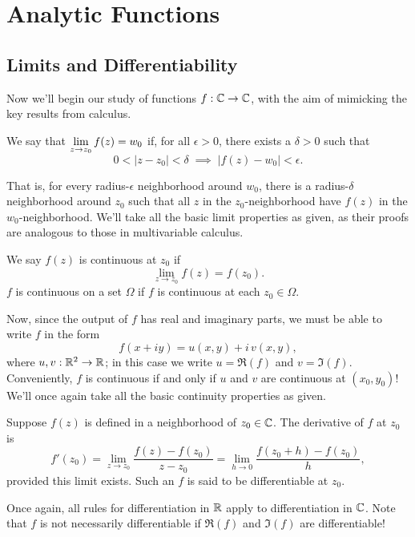 \documentclass[../m136main.tex]{subfiles}
\begin{document}
\chapter{Analytic Functions}
\section{Limits and Differentiability}
Now we'll begin our study of functions $f : \mathbb{C} \to \mathbb{C}$, with the aim of mimicking the key results from calculus.

\begin{definition}[Limit]
    We say that $\displaystyle \lim_{z \to z_0} f(z) = w_0$ if, for all $\epsilon > 0$, there exists a $\delta > 0$ such that \vspace{-6pt}
    \[ 0 < |z - z_0| < \delta \;\implies\; |f(z) - w_0| < \epsilon. \]
\end{definition}

That is, for every radius-$\epsilon$ neighborhood around $w_0$, there is a radius-$\delta$ neighborhood around $z_0$ such that all $z$ in the $z_0$-neighborhood have $f(z)$ in the $w_0$-neighborhood.
We'll take all the basic limit properties as given, as their proofs are analogous to those in multivariable calculus.

\begin{definition}[Continuity]
    We say $f(z)$ is continuous at $z_0$ if
    \[ \lim_{z \to z_0} f(z) = f(z_0). \]
    $f$ is continuous on a set $\Omega$ if $f$ is continuous at each $z_0 \in \Omega$.
\end{definition}

Now, since the output of $f$ has real and imaginary parts, we must be able to write $f$ in the form
\[ f(x + iy) = u(x,y) + i \, v(x,y), \]
where $u,v : \mathbb{R}^2 \to \mathbb{R}$; in this case we write $u = \Re(f)$ and $v = \Im(f)$.
Conveniently, $f$ is continuous if and only if $u$ and $v$ are continuous at $(x_0, y_0)$!
We'll once again take all the basic continuity properties as given.

\begin{definition}[Derivative]
    Suppose $f(z)$ is defined in a neighborhood of $z_0 \in \mathbb{C}$.
    The derivative of $f$ at $z_0$ is
    \[ f'(z_0) = \lim_{z \to z_0} \frac{f(z) - f(z_0)}{z - z_0} = \lim_{h \to 0} \frac{f(z_0 + h) - f(z_0)}{h}, \]
    provided this limit exists.
    Such an $f$ is said to be differentiable at $z_0$.
\end{definition}

Once again, all rules for differentiation in $\mathbb{R}$ apply to differentiation in $\mathbb{C}$.
Note that $f$ is not necessarily differentiable if $\Re(f)$ and $\Im(f)$ are differentiable!
\end{document}
